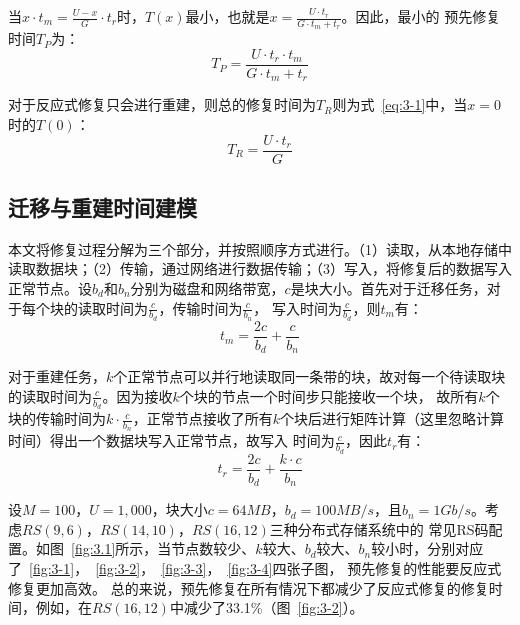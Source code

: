 当$x \cdot t_m = \frac{U-x}{G} \cdot t_r$时，$T(x)$最小，也就是$x = \frac{U \cdot t_{r}}{G \cdot t_{m}+t_{r}}$。因此，最小的
预先修复时间$T_P$为：
\begin{equation}
	\label{eq:3-2}
	T_{P}=\frac{U \cdot t_{r} \cdot t_{m}}{G \cdot t_{m}+t_{r}}
\end{equation}

对于反应式修复只会进行重建，则总的修复时间为$T_R$则为式~\ref{eq:3-1}中，当$x=0$时的$T(0)$：
\begin{equation}
	\label{eq:3-3}
	T_{R}=\frac{U \cdot t_{r}}{G}
\end{equation}

\subsection{迁移与重建时间建模}
本文将修复过程分解为三个部分，并按照顺序方式进行。（1）读取，从本地存储中读取数据块；（2）传输，通过网络进行数据传输；（3）写入，将修复后的数据写入
正常节点。设$b_d$和$b_n$分别为磁盘和网络带宽，$c$是块大小。首先对于迁移任务，对于每个块的读取时间为$\frac{c}{b_d}$，传输时间为$\frac{c}{b_n}$，
写入时间为$\frac{c}{b_d}$，则$t_m$有：
\begin{equation}
	\label{eq:3-4}
    t_{m}=\frac{2c}{b_{d}}+\frac{c}{b_{n}}
\end{equation}

对于重建任务，$k$个正常节点可以并行地读取同一条带的块，故对每一个待读取块的读取时间为$\frac{c}{b_d}$。因为接收$k$个块的节点一个时间步只能接收一个块，
故所有$k$个块的传输时间为$k \cdot \frac{c}{b_n}$，正常节点接收了所有$k$个块后进行矩阵计算（这里忽略计算时间）得出一个数据块写入正常节点，故写入
时间为$\frac{c}{b_d}$，因此$t_r$有：
\begin{equation}
	\label{eq:3-5}
    t_{r}=\frac{2c}{b_{d}}+\frac{k \cdot c}{b_{n}}
\end{equation}

设$M=100$，$U=1,000$，块大小$c=64MB$，$b_d=100MB/s$，且$b_n=1Gb/s$。考虑$RS(9,6)$，$RS(14,10)$，$RS(16,12)$三种分布式存储系统中的
常见RS码配置。如图~\ref{fig:3.1}所示，当节点数较少、$k$较大、$b_d$较大、$b_n$较小时，分别对应了~\ref{fig:3-1}，~\ref{fig:3-2}，~\ref{fig:3-3}，~\ref{fig:3-4}四张子图，
预先修复的性能要反应式修复更加高效。
总的来说，预先修复在所有情况下都减少了反应式修复的修复时间，例如，在$RS(16, 12)$中减少了33.1\%（图~\ref{fig:3-2}）。


